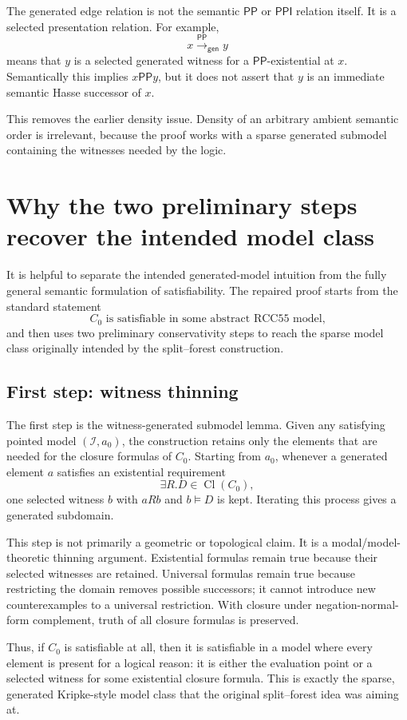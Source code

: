 \documentclass[11pt]{article}
\newcommand{\RCC}{\mathrm{RCC5}}
\newcommand{\PP}{\mathsf{PP}}
\newcommand{\PPI}{\mathsf{PPI}}
\newcommand{\Cl}{\operatorname{Cl}}
\newcommand{\gen}{\mathsf{gen}}
\theoremstyle{definition}
\theoremstyle{plain}
\begin{document}
The generated edge relation is not the semantic $\PP$ or $\PPI$ relation itself.  It is a selected presentation relation.  For example,
\[
x \xrightarrow{\PP}_{\gen} y
\]
means that $y$ is a selected generated witness for a $\PP$-existential at $x$.  Semantically this implies $x\PP y$, but it does not assert that $y$ is an immediate semantic Hasse successor of $x$.

This removes the earlier density issue.  Density of an arbitrary ambient semantic order is irrelevant, because the proof works with a sparse generated submodel containing the witnesses needed by the logic.


\section{Why the two preliminary steps recover the intended model class}

It is helpful to separate the intended generated-model intuition from the fully general semantic formulation of satisfiability.  The repaired proof starts from the standard statement
\[
C_0 \text{ is satisfiable in some abstract } \RCC5 \text{ model,}
\]
and then uses two preliminary conservativity steps to reach the sparse model class originally intended by the split--forest construction.

\subsection{First step: witness thinning}

The first step is the witness-generated submodel lemma.  Given any satisfying pointed model $(\mathcal I,a_0)$, the construction retains only the elements that are needed for the closure formulas of $C_0$.  Starting from $a_0$, whenever a generated element $a$ satisfies an existential requirement
\[
\exists R.D\in \Cl(C_0),
\]
one selected witness $b$ with $aRb$ and $b\models D$ is kept.  Iterating this process gives a generated subdomain.

This step is not primarily a geometric or topological claim.  It is a modal/model-theoretic thinning argument.  Existential formulas remain true because their selected witnesses are retained.  Universal formulas remain true because restricting the domain removes possible successors; it cannot introduce new counterexamples to a universal restriction.  With closure under negation-normal-form complement, truth of all closure formulas is preserved.

Thus, if $C_0$ is satisfiable at all, then it is satisfiable in a model where every element is present for a logical reason: it is either the evaluation point or a selected witness for some existential closure formula.  This is exactly the sparse, generated Kripke-style model class that the original split--forest idea was aiming at.
\end{document}
